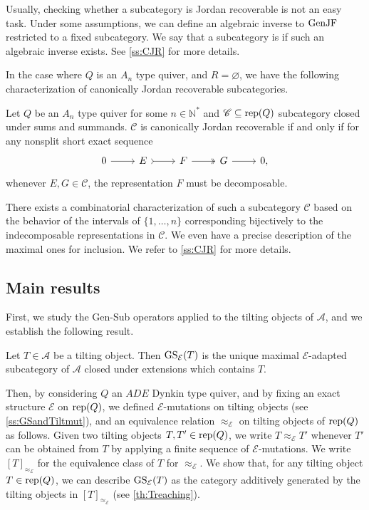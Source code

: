 Usually, checking whether a subcategory is Jordan recoverable is not an easy task. Under some assumptions, we can define an algebraic inverse to $\operatorname{GenJF}$ restricted to a fixed subcategory. We say that a subcategory is  if such an algebraic inverse exists. See \cref{ss:CJR} for more details.

In the case where $Q$ is an $A_n$ type quiver, and $R = \varnothing$, we have the following characterization of canonically Jordan recoverable subcategories.

\begin{theorem}[{\cite{D23}}] \label{thm:CJRAlg}
    Let $Q$ be an $A_n$ type quiver for some $n \in \mathbb{N}^*$ and $\mathscr{C}  \subseteq \operatorname{rep}(Q)$ subcategory closed under sums and summands. $\mathscr{C}$ is canonically Jordan recoverable if and only if for any nonsplit short exact sequence \[\begin{tikzcd}
	0 & E & F  & G &  0,
	\arrow[from=1-1, to=1-2]
	\arrow[tail, from=1-2, to=1-3]
	\arrow[two heads,from=1-3, to=1-4]
	\arrow[from=1-4, to=1-5]
\end{tikzcd}\] whenever $E,G\in \mathscr{C}$, the representation $F$ must be decomposable.
\end{theorem}

There exists a combinatorial characterization of such a subcategory $\mathscr{C}$ based on the behavior of the intervals of $\{1,\ldots,n\}$ corresponding bijectively to the indecomposable representations in $\mathscr{C}$. We even have a precise description of the maximal ones for inclusion. We refer to \cref{ss:CJR} for more details.

\subsection{Main results}
\label{ss:Main}

First, we study the Gen-Sub operators applied to the tilting objects of $\mathscr{A}$, and we establish the following result.

\begin{theorem}
\label{thm:maximalmain}
 Let $T \in \mathscr{A}$ be a tilting object. Then $\operatorname{GS}_\mathcal{E}(T)$ is the unique maximal $\mathcal{E}$-adapted subcategory of $\mathscr{A}$ closed under extensions which contains $T$.
\end{theorem}

Then, by considering $Q$ an $ADE$ Dynkin type quiver, and by fixing an exact structure $\mathcal{E}$ on $\operatorname{rep}(Q)$, we defined $\mathcal{E}$-mutations on tilting objects (see \cref{ss:GSandTiltmut}), and an equivalence relation $\approx_\mathcal{E}$ on tilting objects of $\operatorname{rep}(Q)$ as follows. Given two tilting objects $T,T' \in \operatorname{rep}(Q)$, we write $T \approx_\mathcal{E} T'$ whenever $T'$ can be obtained from $T$ by applying a finite sequence of $\mathcal{E}$-mutations. We write $[T]_{\approx_{\mathcal{E}}}$ for the equivalence class of $T$ for $\approx_\mathcal{E}$. We show that, for any tilting object $T \in \operatorname{rep}(Q)$, we can describe $\operatorname{GS}_\mathcal{E}(T)$ as the category additively generated by the tilting objects in $[T]_{\approx_{\mathcal{E}}}$ (see \cref{th:Treaching}).

